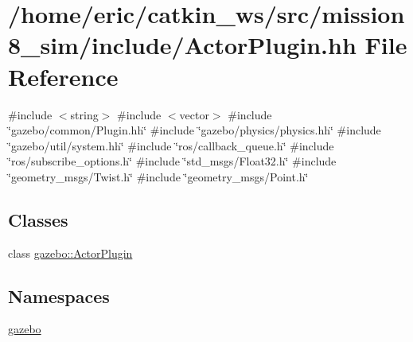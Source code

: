 \hypertarget{include_2ActorPlugin_8hh}{}\section{/home/eric/catkin\+\_\+ws/src/mission8\+\_\+sim/include/\+Actor\+Plugin.hh File Reference}
\label{include_2ActorPlugin_8hh}
{\ttfamily \#include $<$string$>$}\newline
{\ttfamily \#include $<$vector$>$}\newline
{\ttfamily \#include \char`\"{}gazebo/common/\+Plugin.\+hh\char`\"{}}\newline
{\ttfamily \#include \char`\"{}gazebo/physics/physics.\+hh\char`\"{}}\newline
{\ttfamily \#include \char`\"{}gazebo/util/system.\+hh\char`\"{}}\newline
{\ttfamily \#include \char`\"{}ros/callback\+\_\+queue.\+h\char`\"{}}\newline
{\ttfamily \#include \char`\"{}ros/subscribe\+\_\+options.\+h\char`\"{}}\newline
{\ttfamily \#include \char`\"{}std\+\_\+msgs/\+Float32.\+h\char`\"{}}\newline
{\ttfamily \#include \char`\"{}geometry\+\_\+msgs/\+Twist.\+h\char`\"{}}\newline
{\ttfamily \#include \char`\"{}geometry\+\_\+msgs/\+Point.\+h\char`\"{}}\newline
\subsection*{Classes}
\begin{DoxyCompactItemize}
\item 
class \mbox{\hyperlink{classgazebo_1_1ActorPlugin}{gazebo\+::\+Actor\+Plugin}}
\end{DoxyCompactItemize}
\subsection*{Namespaces}
\begin{DoxyCompactItemize}
\item 
 \mbox{\hyperlink{namespacegazebo}{gazebo}}
\end{DoxyCompactItemize}
